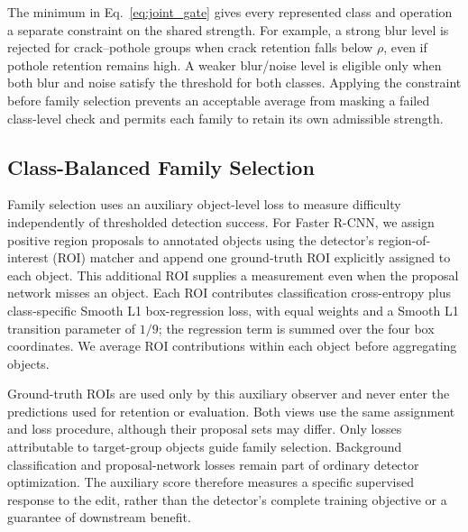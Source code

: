 \documentclass[conference]{IEEEtran}
\begin{document}
The minimum in Eq.~\ref{eq:joint_gate} gives every represented class and operation a separate constraint on the shared strength. For example, a strong blur level is rejected for crack--pothole groups when crack retention falls below $\rho$, even if pothole retention remains high. A weaker blur/noise level is eligible only when both blur and noise satisfy the threshold for both classes. Applying the constraint before family selection prevents an acceptable average from masking a failed class-level check and permits each family to retain its own admissible strength.

\subsection{Class-Balanced Family Selection}
\label{sec:method_allocation}
Family selection uses an auxiliary object-level loss to measure difficulty independently of thresholded detection success. For Faster R-CNN, we assign positive region proposals to annotated objects using the detector's region-of-interest (ROI) matcher and append one ground-truth ROI explicitly assigned to each object. This additional ROI supplies a measurement even when the proposal network misses an object. Each ROI contributes classification cross-entropy plus class-specific Smooth L1 box-regression loss, with equal weights and a Smooth L1 transition parameter of $1/9$; the regression term is summed over the four box coordinates. We average ROI contributions within each object before aggregating objects.

Ground-truth ROIs are used only by this auxiliary observer and never enter the predictions used for retention or evaluation. Both views use the same assignment and loss procedure, although their proposal sets may differ. Only losses attributable to target-group objects guide family selection. Background classification and proposal-network losses remain part of ordinary detector optimization. The auxiliary score therefore measures a specific supervised response to the edit, rather than the detector's complete training objective or a guarantee of downstream benefit.
\end{document}
